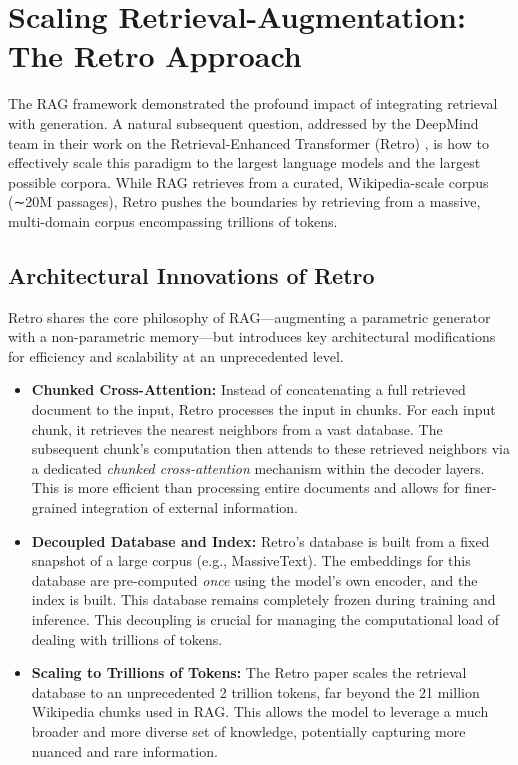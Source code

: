 \documentclass[a4paper,12pt]{article}
\begin{document}
\section{Scaling Retrieval-Augmentation: The Retro Approach}
\label{sec:retro}

The RAG framework demonstrated the profound impact of integrating retrieval with generation. A natural subsequent question, addressed by the DeepMind team in their work on the Retrieval-Enhanced Transformer (Retro) \cite{deepmind2022retro}, is how to effectively scale this paradigm to the largest language models and the largest possible corpora. While RAG retrieves from a curated, Wikipedia-scale corpus (∼20M passages), Retro pushes the boundaries by retrieving from a massive, multi-domain corpus encompassing trillions of tokens.

\subsection{Architectural Innovations of Retro}

Retro shares the core philosophy of RAG—augmenting a parametric generator with a non-parametric memory—but introduces key architectural modifications for efficiency and scalability at an unprecedented level.

\begin{itemize}
    \item \textbf{Chunked Cross-Attention:} Instead of concatenating a full retrieved document to the input, Retro processes the input in chunks. For each input chunk, it retrieves the nearest neighbors from a vast database. The subsequent chunk's computation then attends to these retrieved neighbors via a dedicated \textit{chunked cross-attention} mechanism within the decoder layers. This is more efficient than processing entire documents and allows for finer-grained integration of external information.
    \item \textbf{Decoupled Database and Index:} Retro's database is built from a fixed snapshot of a large corpus (e.g., MassiveText). The embeddings for this database are pre-computed \textit{once} using the model's own encoder, and the index is built. This database remains completely frozen during training and inference. This decoupling is crucial for managing the computational load of dealing with trillions of tokens.
    \item \textbf{Scaling to Trillions of Tokens:} The Retro paper scales the retrieval database to an unprecedented 2 trillion tokens, far beyond the 21 million Wikipedia chunks used in RAG. This allows the model to leverage a much broader and more diverse set of knowledge, potentially capturing more nuanced and rare information.
\end{itemize}
\end{document}
